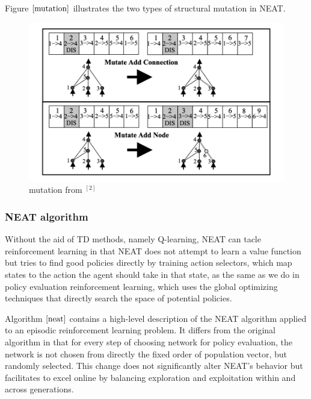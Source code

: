 \documentclass{article}
\begin{document}
Figure $\ref{mutation}$ illustrates the two types of structural mutation in NEAT. 
   
\begin{figure}[htbp]
    \centering
    \includegraphics[width = .75\textwidth]{mutation}
    \caption{mutation from $^{[2]}$}
    \label{mutation}
  \end{figure}


\subsubsection{NEAT algorithm}
Without the aid of TD methods, namely Q-learning, NEAT can tacle reinforcement learning in that NEAT does not attempt to learn a value function but tries to find good policies directly by training action selectors,
which map states to the action the agent should take in that state, as the same as we do in policy evaluation reinforcement learning, which uses the global optimizing 
techniques that directly search the space of potential policies.

Algorithm $\ref{neat}$ contains a high-level description of the NEAT algorithm applied to an episodic reinforcement learning problem. It differs from 
the original algorithm in that for every step of choosing network for policy evaluation, the network is not chosen from directly the fixed order of
population vector, but randomly selected. This change does not significantly alter NEAT’s behavior but facilitates to excel online by balancing exploration and exploitation within and across generations.
\end{document}
